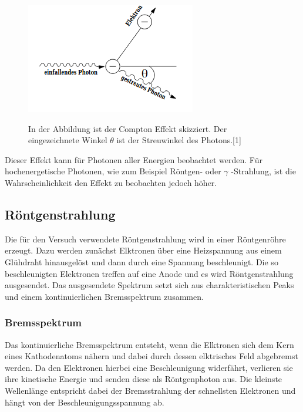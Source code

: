 \documentclass[titlepage = firstcover]{scrartcl}
\begin{document}
        \FloatBarrier
        \begin{figure}[h]
            \centering
            \caption{In der Abbildung ist der Compton Effekt skizziert. Der eingezeichnete Winkel $\theta$ ist der Streuwinkel des Photons.[1]}
            \includegraphics{SkizzeCompton.png}
            \label{fig:SkizzeCompton}
        \end{figure}
        \FloatBarrier
        \noindent

        Dieser Effekt kann für Photonen aller Energien beobachtet werden. Für hochenergetische Photonen, wie zum Beispiel Röntgen- oder $\gamma$ -Strahlung,
        ist die Wahrscheinlichkeit den Effekt zu beobachten jedoch höher.  

        \subsection{Röntgenstrahlung}
        Die für den Versuch verwendete Röntgenstrahlung wird in einer Röntgenröhre erzeugt. Dazu werden zunächst Elktronen über eine Heizspannung aus einem
        Glühdraht hinausgelöst und dann durch eine Spannung beschleunigt. Die so beschleunigten Elektronen treffen auf eine Anode und es wird Röntgenstrahlung
        ausgesendet. Das ausgesendete Spektrum setzt sich aus charakteristischen Peaks und einem kontinuierlichen Bremsspektrum zusammen. 
        
            \subsubsection*{Bremsspektrum}
                Das kontinuierliche Bremsspektrum entsteht, wenn die Elktronen sich dem Kern eines Kathodenatoms nähern und dabei durch dessen elktrisches 
                Feld abgebremst werden. Da den Elektronen hierbei eine Beschleunigung widerfährt, verlieren sie ihre kinetische Energie und senden diese als 
                Röntgenphoton aus. Die kleinste Wellenlänge entspricht dabei der Bremsstrahlung der schnellsten Elektronen und hängt von der 
                Beschleunigungsspannung ab.
                
\end{document}
